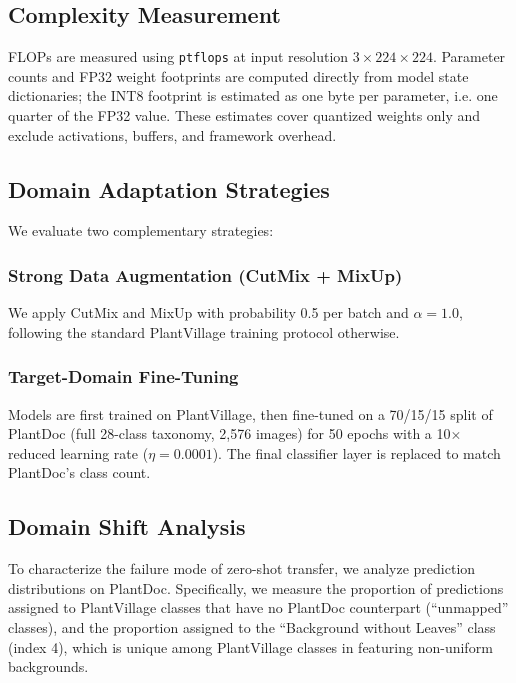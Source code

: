 \documentclass[preprint,12pt]{elsarticle}
\begin{document}
\subsection{Complexity Measurement}

FLOPs are measured using \texttt{ptflops} at input resolution $3\times224\times224$. Parameter counts and FP32 weight footprints are computed directly from model state dictionaries; the INT8 footprint is estimated as one byte per parameter, i.e. one quarter of the FP32 value. These estimates cover quantized weights only and exclude activations, buffers, and framework overhead.

\subsection{Domain Adaptation Strategies}
\label{sec:da_methods}

We evaluate two complementary strategies:

\subsubsection{Strong Data Augmentation (CutMix + MixUp)}

We apply CutMix and MixUp with probability 0.5 per batch and $\alpha=1.0$, following the standard PlantVillage training protocol otherwise.

\subsubsection{Target-Domain Fine-Tuning}

Models are first trained on PlantVillage, then fine-tuned on a 70/15/15 split of PlantDoc (full 28-class taxonomy, 2,576 images) for 50 epochs with a 10$\times$ reduced learning rate ($\eta=0.0001$). The final classifier layer is replaced to match PlantDoc's class count.

\subsection{Domain Shift Analysis}

To characterize the failure mode of zero-shot transfer, we analyze prediction distributions on PlantDoc. Specifically, we measure the proportion of predictions assigned to PlantVillage classes that have no PlantDoc counterpart (``unmapped'' classes), and the proportion assigned to the ``Background without Leaves'' class (index 4), which is unique among PlantVillage classes in featuring non-uniform backgrounds.
\end{document}
